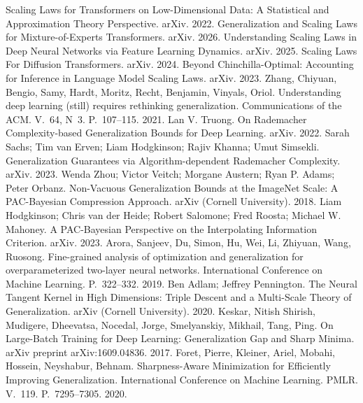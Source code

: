  Scaling Laws for Transformers on Low-Dimensional Data: A Statistical and Approximation Theory Perspective. arXiv. 2022.
 Generalization and Scaling Laws for Mixture-of-Experts Transformers. arXiv. 2026.
 Understanding Scaling Laws in Deep Neural Networks via Feature Learning Dynamics. arXiv. 2025.
 Scaling Laws For Diffusion Transformers. arXiv. 2024.
 Beyond Chinchilla-Optimal: Accounting for Inference in Language Model Scaling Laws. arXiv. 2023.
 Zhang, Chiyuan, Bengio, Samy, Hardt, Moritz, Recht, Benjamin, Vinyals, Oriol. Understanding deep learning (still) requires rethinking generalization. Communications of the ACM. V.~64, N~3. P.~107--115. 2021.
 Lan V. Truong. On Rademacher Complexity-based Generalization Bounds for Deep Learning. arXiv. 2022.
 Sarah Sachs; Tim van Erven; Liam Hodgkinson; Rajiv Khanna; Umut Simsekli. Generalization Guarantees via Algorithm-dependent Rademacher Complexity. arXiv. 2023.
 Wenda Zhou; Victor Veitch; Morgane Austern; Ryan P. Adams; Peter Orbanz. Non-Vacuous Generalization Bounds at the ImageNet Scale: A PAC-Bayesian Compression Approach. arXiv (Cornell University). 2018.
 Liam Hodgkinson; Chris van der Heide; Robert Salomone; Fred Roosta; Michael W. Mahoney. A PAC-Bayesian Perspective on the Interpolating Information Criterion. arXiv. 2023.
 Arora, Sanjeev, Du, Simon, Hu, Wei, Li, Zhiyuan, Wang, Ruosong. Fine-grained analysis of optimization and generalization for overparameterized two-layer neural networks. International Conference on Machine Learning. P.~322--332. 2019.
 Ben Adlam; Jeffrey Pennington. The Neural Tangent Kernel in High Dimensions: Triple Descent and a Multi-Scale Theory of Generalization. arXiv (Cornell University). 2020.
 Keskar, Nitish Shirish, Mudigere, Dheevatsa, Nocedal, Jorge, Smelyanskiy, Mikhail, Tang, Ping. On Large-Batch Training for Deep Learning: Generalization Gap and Sharp Minima. arXiv preprint arXiv:1609.04836. 2017.
 Foret, Pierre, Kleiner, Ariel, Mobahi, Hossein, Neyshabur, Behnam. Sharpness-Aware Minimization for Efficiently Improving Generalization. International Conference on Machine Learning. PMLR. V.~119. P.~7295--7305. 2020.
